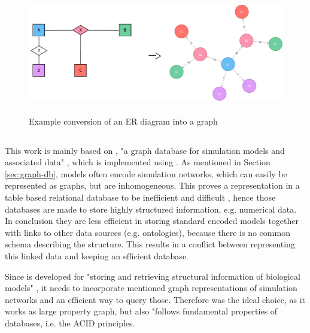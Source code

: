 \begin{figure}
	\center
	\includegraphics[height=150pt]{resources/er-to-neo4j.pdf}
	\caption{Example conversion of an ER diagram into a \neoj graph}
	
	
	\label{fig:example-er-diagram}
\end{figure}

\subsection{\masymos}
\label{sec:background:graph-db:masymos}

This work is mainly based on \masymos, "a graph database for simulation models and associated data" \cite{Henkel2015}, which is implemented using \neoj {}.
As mentioned in Section \ref{sec:graph-db}, models often encode simulation networks, which can easily be represented as graphs, but are inhomogeneous. This proves a representation in a table based relational database to be inefficient and difficult , hence those databases are made to store highly structured information, e.g. numerical data. In conclusion they are less efficient in storing standard encoded models together with links to other data sources (e.g. ontologies), because there is no common schema describing the structure. This results in a conflict between representing this linked data and keeping an efficient database.

Since \masymos is developed for "storing and retrieving structural information of biological models" \cite{Henkel2015}, it needs to incorporate mentioned graph representations of simulation networks and an efficient way to query those. Therefore \neoj was the ideal choice, as it works as large property graph, but also "follows fundamental properties of databases, i.e. the ACID principles. \cite{Henkel2015}

